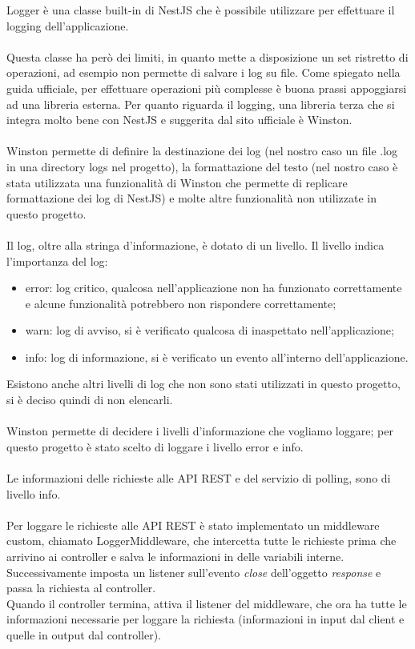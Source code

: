 \leavevmode\newline
Logger è una classe built-in di NestJS che è possibile utilizzare per effettuare il logging 
dell'applicazione. 
\\\\
Questa classe ha però dei limiti, in quanto mette a disposizione un set ristretto di operazioni, ad esempio 
non permette di salvare i log su file. Come spiegato nella 
guida ufficiale, per effettuare operazioni più complesse è buona prassi appoggiarsi ad una libreria
esterna. Per quanto riguarda il logging, una libreria terza che si integra molto bene con NestJS e suggerita dal sito ufficiale è
Winston.
\\\\
Winston permette di definire la destinazione dei log (nel nostro caso un file .log in una directory logs nel
progetto), la formattazione del testo (nel nostro caso è stata utilizzata una funzionalità di Winston che permette
di replicare formattazione dei log di NestJS) e molte altre funzionalità non utilizzate
in questo progetto.
\\\\
Il log, oltre alla stringa d'informazione, è dotato di un livello.
Il livello 
indica l'importanza del log:
\begin{itemize}
    \item error: log critico, qualcosa nell'applicazione non ha funzionato correttamente e
        alcune funzionalità potrebbero non rispondere correttamente;
    \item warn: log di avviso, si è verificato qualcosa di inaspettato nell'applicazione;
    \item info: log di informazione, si è verificato un evento all'interno dell'applicazione.
\end{itemize}
\leavevmode\newline
Esistono anche altri livelli di log che non sono stati utilizzati in questo progetto, si è deciso quindi di non elencarli.
\\\\
Winston permette di decidere i livelli d'informazione che vogliamo loggare; per questo progetto è stato scelto di loggare
i livello error e info.
\\\\
Le informazioni delle richieste alle \gls{API} \gls{REST} e del servizio di polling, sono di livello info.
\\\\
Per loggare le richieste alle \gls{API} \gls{REST} è stato implementato un middleware custom, chiamato LoggerMiddleware, che intercetta tutte le 
richieste prima che arrivino ai controller e salva le informazioni in delle variabili interne.
\\
Successivamente imposta un listener sull'evento \textit{close} dell'oggetto \textit{response} e passa la richiesta al controller.
\\
Quando il controller termina, attiva il listener del middleware, che ora ha tutte le informazioni necessarie per loggare la richiesta 
(informazioni in input dal client e quelle in output dal controller).

